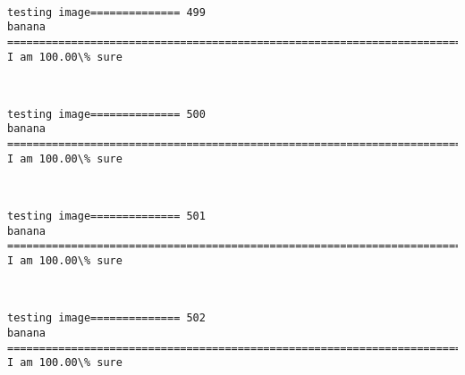 \documentclass[11pt]{article}
\begin{document}
    \begin{center}
    \end{center}
    { \hspace*{\fill} \\}
    
    \begin{Verbatim}[commandchars=\\\{\}]
testing image============== 499
banana
============================================================================
I am 100.00\% sure

    \end{Verbatim}

    \begin{center}
    \end{center}
    { \hspace*{\fill} \\}
    
    \begin{Verbatim}[commandchars=\\\{\}]
testing image============== 500
banana
============================================================================
I am 100.00\% sure

    \end{Verbatim}

    \begin{center}
    \end{center}
    { \hspace*{\fill} \\}
    
    \begin{Verbatim}[commandchars=\\\{\}]
testing image============== 501
banana
============================================================================
I am 100.00\% sure

    \end{Verbatim}

    \begin{center}
    \end{center}
    { \hspace*{\fill} \\}
    
    \begin{Verbatim}[commandchars=\\\{\}]
testing image============== 502
banana
============================================================================
I am 100.00\% sure

    \end{Verbatim}
\end{document}
